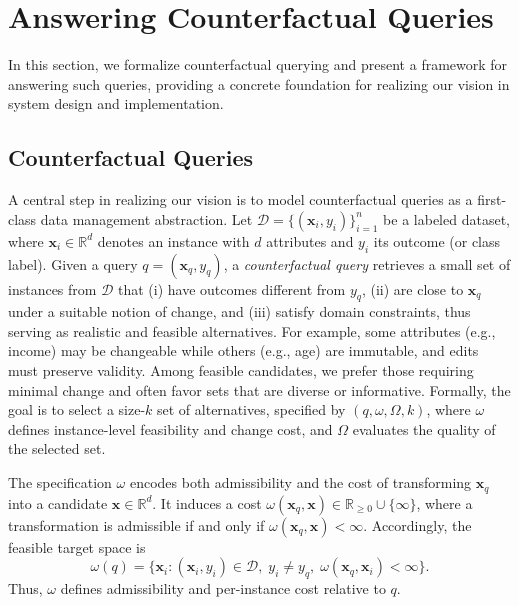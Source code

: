 \section{Answering Counterfactual Queries}
\label{sec:query-answering}

In this section, we formalize counterfactual querying and present a framework for answering such queries, providing a concrete foundation for realizing our vision in system design and implementation.

\subsection{Counterfactual Queries}

A central step in realizing our vision is to model counterfactual queries as a first-class data management abstraction. Let $\mathcal D=\{(\mathbf{x}_i,y_i)\}_{i=1}^n$ be a labeled dataset, where $\mathbf{x}_i \in \mathbb{R}^d$ denotes an instance with $d$ attributes and $y_i$ its outcome (or class label). Given a query $q=(\mathbf{x}_q,y_q)$, a \emph{counterfactual query} retrieves a small set of instances from $\mathcal D$ that (i) have outcomes different from $y_q$, (ii) are close to $\mathbf{x}_q$ under a suitable notion of change, and (iii) satisfy domain constraints, thus serving as realistic and feasible alternatives. For example, some attributes (e.g., income) may be changeable while others (e.g., age) are immutable, and edits must preserve validity. Among feasible candidates, we prefer those requiring minimal change and often favor sets that are diverse or informative. Formally, the goal is to select a size-$k$ set of alternatives, specified by $(q,\omega,\Omega,k)$, where $\omega$ defines instance-level feasibility and change cost, and $\Omega$ evaluates the quality of the selected set.

The specification $\omega$ encodes both admissibility and the cost of transforming $\mathbf{x}_q$ into a candidate $\mathbf{x}\in\mathbb R^d$. It induces a cost $\omega(\mathbf{x}_q,\mathbf{x})\in\mathbb R_{\ge 0}\cup\{\infty\}$, where a transformation is admissible if and only if $\omega(\mathbf{x}_q,\mathbf{x})<\infty$. Accordingly, the feasible target space is
\begingroup\small
\begin{equation}
\mathcal \omega(q)
=
\{\mathbf{x}_i : (\mathbf{x}_i,y_i)\in\mathcal D,\; y_i\neq y_q,\; \omega(\mathbf{x}_q,\mathbf{x}_i)<\infty\}.
\label{eq:feasible}
\end{equation}
\endgroup
Thus, $\omega$ defines admissibility and per-instance cost relative to $q$.

